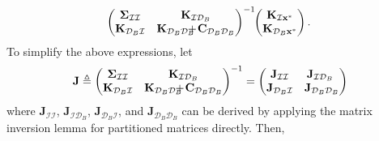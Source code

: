 \documentclass[conference]{IEEEtran}
\begin{document}
\begin{equation*}
\begin{array}{l}
			\hspace{-1mm}
			\begin{pmatrix}
				\mathbf{\Sigma}_\mathcal{II} & \mathbf{K}_{\mathcal{I}\mathcal{D}_B} \\
				\mathbf{K}_{\mathcal{D}_B\mathcal{I}} & \mathbf{K}_{\mathcal{D}_B\mathcal{D}_B}\hspace{-3mm} + \hspace{-0.5mm} \mathbf{C}_{\mathcal{D}_B\mathcal{D}_B}
			\end{pmatrix}^{-1}
			\hspace{-1mm}
			\begin{pmatrix}
				\mathbf{K}_{\mathcal{I}\mathbf{x}^*}\\
				\mathbf{K}_{\mathcal{D}_B\mathbf{x}^*}
			\end{pmatrix}.
		\end{array}
	\end{equation*}
	To simplify the above expressions, let
	\begin{equation*}
		\mathbf{J}\triangleq
		\begin{pmatrix}
			\mathbf{\Sigma}_{\mathcal{I}\mathcal{I}} & \mathbf{K}_{\mathcal{I}\mathcal{D}_B} \\
			\mathbf{K}_{\mathcal{D}_B\mathcal{I}} & \mathbf{K}_{\mathcal{D}_B\mathcal{D}_B}\hspace{-3mm} + \hspace{-0.5mm} \mathbf{C}_{\mathcal{D}_B\mathcal{D}_B}
		\end{pmatrix}^{-1}=
		\begin{pmatrix}
			\mathbf{J}_{\mathcal{I}\mathcal{I}} & \hspace{-1mm}\mathbf{J}_{\mathcal{I}\mathcal{D}_B} \\
			\mathbf{J}_{\mathcal{D}_B\mathcal{I}} & \mathbf{J}_{\mathcal{D}_B\mathcal{D}_B}
		\end{pmatrix}
	\end{equation*}
	where $\mathbf{J}_{\mathcal{I}\mathcal{I}}$, $\mathbf{J}_{\mathcal{I}\mathcal{D}_B}$,
	$\mathbf{J}_{\mathcal{D}_B\mathcal{I}}$, and $\mathbf{J}_{\mathcal{D}_B\mathcal{D}_B}$ can be derived by applying the matrix inversion lemma for partitioned matrices directly.
	Then,
\end{document}

